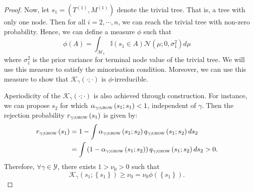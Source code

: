 \documentclass[
12pt]{article}
\begin{document}
\begin{proof}
		Now, let $s_1 = \left(T^{(1)},M^{(1)}\right)$ denote the trivial tree. That is, a tree with only one node. Then for all $i=2,\cdots, n$, we can reach the trivial tree with non-zero probability. Hence, we can define a measure $\phi$ such that
		\begin{equation*}
			\phi(A) = \int_{\mathcal{M}_1}\mathbb{I}\left(s_1\in A\right)\mathcal{N}\left(\mu;0,\sigma_1^2\right)d\mu
		\end{equation*}
		where $\sigma^2_1$ is the prior variance for terminal node value of the trivial tree. We will use this measure to satisfy the minorisation condition. Moreover, we can use this measure to show that $\mathcal{K}_{\gamma}(\cdot;\cdot)$ is $\phi$-irreducible. 
		
		Aperiodicity of the $\mathcal{K}_{\gamma}(\cdot;\cdot)$ is also achieved through construction. For instance, we can propose $s_2$ for which $\alpha_{\gamma;\textsc{grow}}\left(s_1; s_1\right) < 1$, independent of $\gamma$. Then the rejection probability $r_{\gamma;\textsc{grow}}\left(s_1\right)$ is given by:
		\begin{align*}
			r_{\gamma;\textsc{grow}}\left(s_1\right)
			&=1-\int \alpha_{\gamma;\textsc{grow}}\left(s_1; s_2\right)q_{\gamma;\textsc{grow}}\left(s_1; s_2\right) ds_2\\
			&=\int\left(1 - \alpha_{\gamma;\textsc{grow}}\left(s_1; s_2\right)\right) q_{\gamma;\textsc{grow}}\left(s_1; s_2\right) ds_2 > 0.
		\end{align*}
		Therefore, $\forall\gamma\in\mathcal{Y}$, there exists $1>\nu_0 >0$ such that
		\begin{equation}\label{eq:stay:trivial}
			\mathcal{K}_{\gamma}\left(s_1;\left\{s_1\right\}\right) \ge \nu_0 = \nu_0 \phi\left(\left\{s_1\right\}\right).
		\end{equation}
		

\end{proof}
\end{document}
